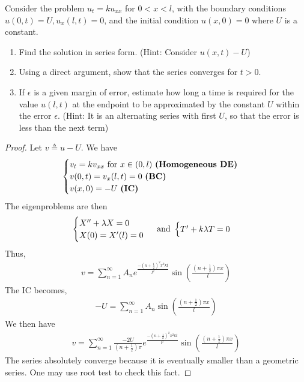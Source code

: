 \documentclass{report}
\begin{document}
\begin{question}{}{}
Consider the problem $u_t=ku_{xx}$ for $0<x<l$, with the boundary conditions  $u(0,t)=U,u_x(l,t)=0$, and the initial condition $u(x,0)=0$ where $U$ is a constant. 
 \begin{enumerate}[label=(\alph*)]
  \item Find the solution in series form. (Hint: Consider $u(x,t)-U$) 
  \item Using a direct argument, show that the series converges for $t>0$.  
  \item If $\epsilon $ is a given margin of error, estimate how long a time is required for the value $u(l,t)$ at the endpoint to be approximated by the constant $U$ within the error  $\epsilon $. (Hint: It is an alternating series with first $U$, so that the error is less than the next term)
\end{enumerate}
\end{question}
\begin{proof}
Let $v\triangleq u-U$. We have 
\begin{align*}
\begin{cases}
  v_t=kv_{xx}\text{ for }x\in (0,l)\text{ \textbf{(Homogeneous DE)} } \\
  v(0,t)=v_x(l,t)=0\text{ \textbf{(BC)} }\\
  v(x,0)=-U\text{ \textbf{(IC)} }
\end{cases}
\end{align*}
The eigenproblems are then 
\begin{align*}
\begin{cases}
  X'' + \lambda  X=0 \\
  X(0)=X'(l)=0
\end{cases} \text{ and }\begin{cases}
  T'+ k \lambda T=0
\end{cases}
\end{align*}
Thus, 
\begin{align*}
v= \sum_{n=1}^{\infty} A_ne^{\frac{-(n+ \frac{1}{2})^2 \pi ^2kt}{l^2}}  \sin (\frac{(n+ \frac{1}{2}) \pi  x}{l})
\end{align*}
The IC becomes, 
\begin{align*}
-U= \sum_{n=1}^{\infty} A_n \sin (\frac{(n+ \frac{1}{2})\pi  x}{l})
\end{align*}
We then have 
\begin{align*}
v= \sum_{n=1}^{\infty} \frac{-2U}{(n+ \frac{1}{2})\pi  }  e^{\frac{-(n+ \frac{1}{2})^2 \pi ^2kt}{l^2}}  \sin (\frac{(n+ \frac{1}{2}) \pi  x}{l})
\end{align*}
The series absolutely converge because it is eventually smaller than a geometric series. One may use root test to check this fact.   
\end{proof}
\end{document}
